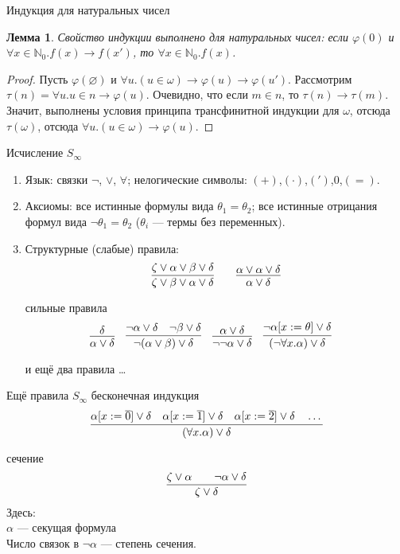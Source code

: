 \documentclass[aspectratio=169]{beamer}
\newtheorem{lmm}{Лемма}[section]
\begin{document}
\begin{frame}{Индукция для натуральных чисел}
\begin{lmm}Свойство индукции выполнено для натуральных чисел:
если $\varphi(0)$ и $\forall x\in\mathbb{N}_0.f(x) \rightarrow f(x')$, то $\forall x\in\mathbb{N}_0.f(x)$.
\end{lmm}

\begin{proof}
Пусть $\varphi(\varnothing)$ и $\forall u.(u \in \omega) \rightarrow \varphi(u) \rightarrow \varphi(u')$.
Рассмотрим $\tau(n) = \forall u.u \in n \rightarrow \varphi(u)$. Очевидно,
что если $m \in n$, то $\tau(n) \rightarrow \tau(m)$. Значит, выполнены условия принципа
трансфинитной индукции для $\omega$, отсюда $\tau(\omega)$, отсюда $\forall u.(u \in \omega) \rightarrow \varphi(u)$.
\end{proof}
\end{frame}

\begin{frame}{Исчисление $S_\infty$}
\begin{enumerate}                             
\item Язык: связки $\neg$, $\vee$, $\forall$; нелогические символы: $(+)$,$(\cdot)$,$(')$,$0$,$(=)$.
\item Аксиомы: все истинные формулы вида $\theta_1=\theta_2$; все истинные отрицания формул вида $\neg\theta_1=\theta_2$
($\theta_i$ --- термы без переменных).
\item Структурные (слабые) правила:
$$\infer{\zeta\vee\beta\vee\alpha\vee\delta}{\zeta\vee\alpha\vee\beta\vee\delta} \quad\quad
\infer{\alpha\vee\delta}{\alpha\vee\alpha\vee\delta}$$

сильные правила
$$\infer{\alpha\vee\delta}{\delta}\quad
\infer{\neg(\alpha\vee\beta)\vee\delta}{\neg\alpha\vee\delta\quad\neg\beta\vee\delta}\quad
\infer{\neg\neg\alpha\vee\delta}{\alpha\vee\delta}\quad
\infer{(\neg\forall x.\alpha)\vee\delta}{\neg\alpha[x := \theta]\vee\delta}\quad$$

и ещё два правила \dots
\end{enumerate}
\end{frame}

\begin{frame}{Ещё правила $S_\infty$}
бесконечная индукция
$$\infer{(\forall x.\alpha)\vee\delta}{\alpha[x:=\overline{0}]\vee\delta
                                  \quad\alpha[x:=\overline{1}]\vee\delta
                                  \quad\alpha[x:=\overline{2}]\vee\delta\quad\dots}$$

сечение
$$\infer{\zeta\vee\delta}{\zeta\vee\alpha\quad\quad\neg\alpha\vee\delta}$$
Здесь: \\
$\alpha$ --- секущая формула \\
Число связок в $\neg\alpha$ --- степень сечения.
\end{frame}
\end{document}
